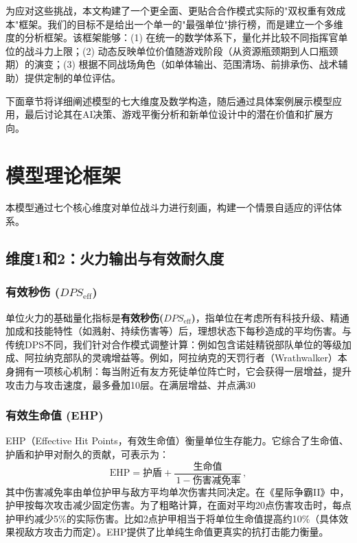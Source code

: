 \documentclass[a4paper,12pt]{article}
\begin{document}
\begin{CJK}{UTF8}{gbsn}
为应对这些挑战，本文构建了一个更全面、更贴合合作模式实际的"双权重有效成本"框架。我们的目标不是给出一个单一的"最强单位"排行榜，而是建立一个多维度的分析框架。该框架能够：(1) 在统一的数学体系下，量化并比较不同指挥官单位的战斗力上限；(2) 动态反映单位价值随游戏阶段（从资源瓶颈期到人口瓶颈期）的演变；(3) 根据不同战场角色（如单体输出、范围清场、前排承伤、战术辅助）提供定制的单位评估。

下面章节将详细阐述模型的七大维度及数学构造，随后通过具体案例展示模型应用，最后讨论其在AI决策、游戏平衡分析和新单位设计中的潜在价值和扩展方向。

\section{模型理论框架}
本模型通过七个核心维度对单位战斗力进行刻画，构建一个情景自适应的评估体系。

\subsection{维度1和2：火力输出与有效耐久度}
\subsubsection{有效秒伤 ($DPS_{\text{eff}}$)}
单位火力的基础量化指标是\textbf{有效秒伤($DPS_{\text{eff}}$)}，指单位在考虑所有科技升级、精通加成和技能特性（如溅射、持续伤害等）后，理想状态下每秒造成的平均伤害。与传统DPS不同，我们针对合作模式调整计算：例如包含诺娃精锐部队单位的等级加成、阿拉纳克部队的灵魂增益等。例如，阿拉纳克的天罚行者（Wrathwalker）本身拥有一项核心机制：每当附近有友方死徒单位阵亡时，它会获得一层增益，提升攻击力与攻击速度，最多叠加10层。在满层增益、并点满30%

\subsubsection{有效生命值 (EHP)}
EHP（Effective Hit Points，有效生命值）衡量单位生存能力。它综合了生命值、护盾和护甲对耐久的贡献，可表示为：
\[
\text{EHP} = \text{护盾} + \frac{\text{生命值}}{\,1 - \text{伤害减免率}}\,,
\]
其中伤害减免率由单位护甲与敌方平均单次伤害共同决定。在《星际争霸II》中，护甲按每次攻击减少固定伤害。为了粗略计算，在面对平均20点伤害攻击时，每点护甲约减少5\%的实际伤害。比如2点护甲相当于将单位生命值提高约10\%（具体效果视敌方攻击力而定）。EHP提供了比单纯生命值更真实的抗打击能力衡量。


\end{CJK}
\end{document}
